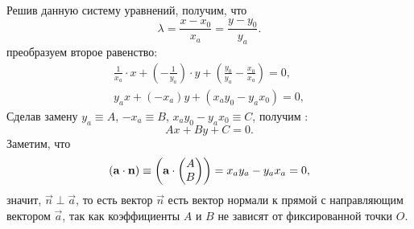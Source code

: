 Решив данную систему уравнений, получим, что
\begin{equation*}
	\lambda = \frac{x - x_0}{x_a} = \frac{y - y_0}{y_a}.
\end{equation*}
преобразуем второе равенство:
\begin{gather*}
	\frac{1}{x_a} \cdot x + \left( - \frac{1}{y_a} \right) \cdot y + \left( \frac{y_0}{y_a} - \frac{x_0}{x_a} \right) = 0,\\
	y_a x + (-x_a)y + (x_a y_0 - y_a x_0) = 0,
\end{gather*}
Сделав замену $y_a \equiv A$, $-x_a \equiv B$, $x_a y_0 - y_a x_0 \equiv C$, получим :
\begin{equation}
	Ax + By + C = 0.
\end{equation}
Заметим, что
\begin{equation*}
	\left(\mathbf{a} \cdot \mathbf{n}\right) \equiv \left(\mathbf{a} \cdot \mathbf{
	\begin{pmatrix}
		A\\
		B
	\end{pmatrix}}\right) = x_a y_a - y_a x_a = 0,
\end{equation*}
значит, $\vec{n} \perp \vec{a}$, то есть вектор $\vec{n}$ есть вектор нормали к прямой с направляющим вектором $\vec{a}$, так как коэффициенты $A$ и $B$ не зависят от фиксированной точки $O$.
